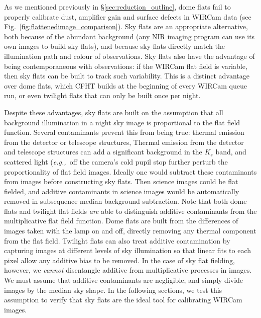 \documentclass[iop]{emulateapj}
\newcommand{\eg}{\textit{e.g.,~}}
\newcommand{\Fig}[1]{Fig.~\ref{fig:#1}}  %
\newcommand{\Sec}[1]{\S\ref{sec:#1}}  %
\begin{document}
As we mentioned previously in \Sec{reduction_outline}, dome flats fail to properly calibrate dust, amplifier gain and surface defects in WIRCam data (see \Fig{flattenedimage_comparison}).
Sky flats are an appropriate alternative, both because of the abundant background (any NIR imaging program can use its own images to build sky flats), and because sky flats directly match the illumination path and colour of observations.
Sky flats also have the advantage of being contemporaneous with observations: if the WIRCam flat field is variable, then sky flats can be built to track such variability.
This is a distinct advantage over dome flats, which CFHT builds at the beginning of every WIRCam queue run, or even twilight flats that can only be built once per night.

Despite these advantages, sky flats are built on the assumption that all background illumination in a night sky image is proportional to the flat field function.
Several contaminants prevent this from being true: thermal emission from the detector or telescope structures, 
Thermal emission from the detector and telescope structures can add a significant background in the $K_s$ band, and scattered light (\eg off the camera's cold pupil stop further perturb the proportionality of flat field images.
Ideally one would subtract these contaminants from images before constructing sky flats.
Then science images could be flat fielded, and additive contaminants in science images would be automatically removed in subsequence median background subtraction.
Note that both dome flats and twilight flat fields \emph{are} able to distinguish additive contaminants from the multiplicative flat field function.
Dome flats are built from the differences of images taken with the lamp on and off, directly removing any thermal component from the flat field.
Twilight flats can also treat additive contamination by capturing images at different levels of sky illumination so that linear fits to each pixel allow any additive bias to be removed.
In the case of sky flat fielding, however, we \emph{cannot} disentangle additive from multiplicative processes in images.
We must assume that additive contaminants are negligible, and simply divide images by the median sky shape.
In the following sections, we test this assumption to verify that sky flats are the ideal tool for calibrating WIRCam images.
\end{document}
